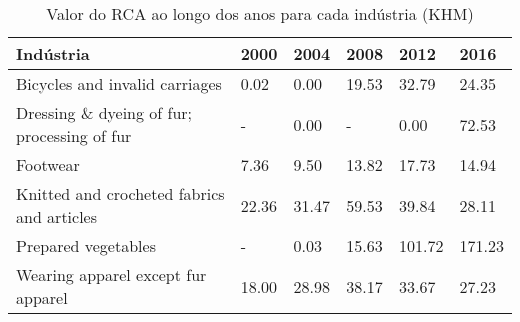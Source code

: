 \begin{table}
\centering
\caption{Valor do RCA ao longo dos anos para cada indústria (KHM)}
\begin{tabular}{p{6cm}p{1.5cm}p{1.5cm}p{1.5cm}p{1.5cm}p{1.5cm}}
\toprule
                                  Indústria &  2000 &  2004 &  2008 &   2012 &   2016 \\
\midrule
             Bicycles and invalid carriages &  0.02 &  0.00 & 19.53 &  32.79 &  24.35 \\
Dressing \& dyeing of fur; processing of fur &     - &  0.00 &     - &   0.00 &  72.53 \\
                                   Footwear &  7.36 &  9.50 & 13.82 &  17.73 &  14.94 \\
 Knitted and crocheted fabrics and articles & 22.36 & 31.47 & 59.53 &  39.84 &  28.11 \\
                        Prepared vegetables &     - &  0.03 & 15.63 & 101.72 & 171.23 \\
         Wearing apparel except fur apparel & 18.00 & 28.98 & 38.17 &  33.67 &  27.23 \\
\bottomrule
\end{tabular}
\end{table}
